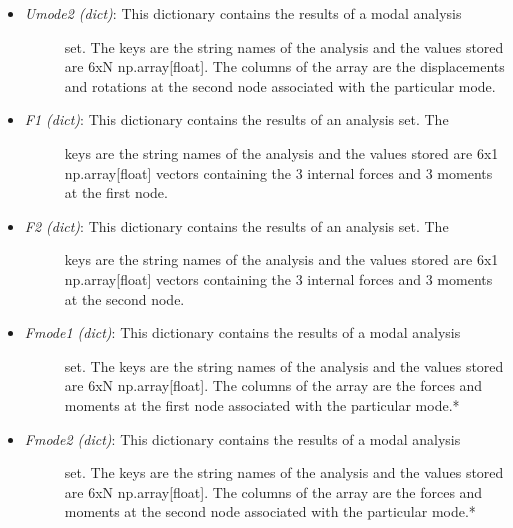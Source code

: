 \documentclass[letterpaper,10pt,english]{sphinxmanual}
\begin{document}
\begin{fulllineitems}
\begin{itemize}
\begin{description}
\end{description}

\item {} \begin{description}
\item[{\emph{Umode2 (dict)}: This dictionary contains the results of a modal analysis}] \leavevmode
set. The keys are the string names of the analysis and the values
stored are 6xN np.array{[}float{]}. The columns of the array are the
displacements and rotations at the second node associated with the
particular mode.

\end{description}

\item {} \begin{description}
\item[{\emph{F1 (dict)}: This dictionary contains the results of an analysis set. The}] \leavevmode
keys are the string names of the analysis and the values stored are
6x1 np.array{[}float{]} vectors containing the 3 internal forces and
3 moments at the first node.

\end{description}

\item {} \begin{description}
\item[{\emph{F2 (dict)}: This dictionary contains the results of an analysis set. The}] \leavevmode
keys are the string names of the analysis and the values stored are
6x1 np.array{[}float{]} vectors containing the 3 internal forces and
3 moments at the second node.

\end{description}

\item {} \begin{description}
\item[{\emph{Fmode1 (dict)}: This dictionary contains the results of a modal analysis}] \leavevmode
set. The keys are the string names of the analysis and the values
stored are 6xN np.array{[}float{]}. The columns of the array are the
forces and moments at the first node associated with the
particular mode.*

\end{description}

\item {} \begin{description}
\item[{\emph{Fmode2 (dict)}: This dictionary contains the results of a modal analysis}] \leavevmode
set. The keys are the string names of the analysis and the values
stored are 6xN np.array{[}float{]}. The columns of the array are the
forces and moments at the second node associated with the
particular mode.*


\end{description}
\end{itemize}
\end{fulllineitems}
\end{document}
